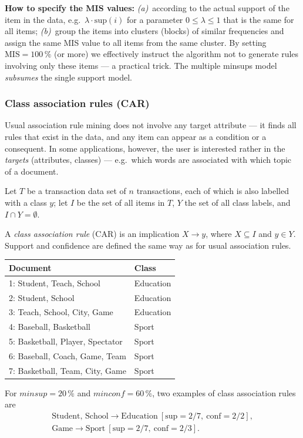 \documentclass[11pt,a4paper]{article}
\theoremstyle{definition}
\begin{document}
\textbf{How to specify the MIS values:} \emph{(a)}~according to the actual support of the item in
the data, e.g.\ $\lambda\cdot\mathrm{sup}(i)$ for a parameter $0\le\lambda\le 1$ that is the same
for all items; \emph{(b)}~group the items into clusters (blocks) of similar frequencies and assign
the same MIS value to all items from the same cluster. By setting $\mathrm{MIS}=100\,\%$ (or
more) we effectively instruct the algorithm not to generate rules involving only these items ---
a practical trick. The multiple minsups model \emph{subsumes} the single support model.

\subsubsection{Class association rules (CAR)}

Usual association rule mining does not involve any target attribute --- it finds all rules that
exist in the data, and any item can appear as a condition or a consequent. In some applications,
however, the user is interested rather in the \emph{targets} (attributes, classes) --- e.g.\ which
words are associated with which topic of a document.

\begin{defbox}
Let $T$ be a transaction data set of $n$ transactions, each of which is also labelled with a
class $y$; let $I$ be the set of all items in $T$, $Y$ the set of all class labels, and
$I\cap Y=\emptyset$.

A \emph{class association rule} (CAR) is an implication $X\to y$, where $X\subseteq I$ and
$y\in Y$. Support and confidence are defined the same way as for usual association rules.
\end{defbox}

\begin{defbox}
\begin{center}
\small
\begin{tabular}{@{}ll@{}}
\toprule
Document & Class \\
\midrule
1: Student, Teach, School & Education \\
2: Student, School & Education \\
3: Teach, School, City, Game & Education \\
4: Baseball, Basketball & Sport \\
5: Basketball, Player, Spectator & Sport \\
6: Baseball, Coach, Game, Team & Sport \\
7: Basketball, Team, City, Game & Sport \\
\bottomrule
\end{tabular}
\end{center}
For $\mathit{minsup}=20\,\%$ and $\mathit{minconf}=60\,\%$, two examples of class association
rules are
\begin{gather*}
\text{Student, School}\to\text{Education}\ [\mathrm{sup}=2/7,\ \mathrm{conf}=2/2],\\
\text{Game}\to\text{Sport}\ [\mathrm{sup}=2/7,\ \mathrm{conf}=2/3].
\end{gather*}
\end{defbox}
\end{document}
